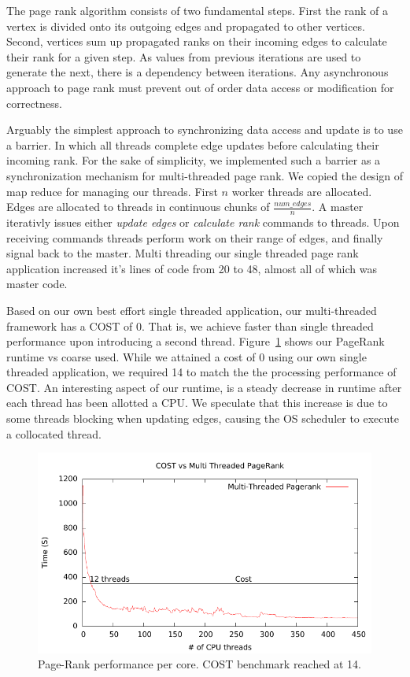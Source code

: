 The page rank algorithm consists of two fundamental steps. First the
rank of a vertex is divided onto its outgoing edges and propagated to
other vertices. Second, vertices sum up propagated ranks on their
incoming edges to calculate their rank for a given step. As values
from previous iterations are used to generate the next, there is a
dependency between iterations. Any asynchronous approach to page rank
must prevent out of order data access or modification for correctness.

Arguably the simplest approach to synchronizing data access and update
is to use a barrier. In which all threads complete edge updates before
calculating their incoming rank. For the sake of simplicity, we
implemented such a barrier as a synchronization mechanism for
multi-threaded page rank. We copied the design of map reduce for
managing our threads. First $n$ worker threads are allocated. Edges
are allocated to threads in continuous chunks of
$\frac{num\_edges}{n}$. A master iterativly issues either \emph{update
edges} or \emph{calculate rank} commands to threads. Upon receiving
commands threads perform work on their range of edges, and finally
signal back to the master. Multi threading our single threaded page
rank application increased it's lines of code from 20 to 48, almost
all of which was master code.

Based on our own best effort single threaded application, our
multi-threaded framework has a COST of 0. That is, we achieve faster
than single threaded performance upon introducing a second thread.
Figure~\ref{fig:page-rank-performance} shows our PageRank runtime vs
coarse used. While we attained a cost of 0 using our own single
threaded application, we required 14 to match the the processing
performance of COST. An interesting aspect of our runtime, is a steady
decrease in runtime after each thread has been allotted a CPU. We
speculate that this increase is due to some threads blocking when
updating edges, causing the OS scheduler to execute a collocated thread.

\begin{figure}[h]
\includegraphics[width=\linewidth]{"fig/page_rank_performance"}
\caption{Page-Rank performance per core. COST benchmark reached at 14.}
\label{fig:page-rank-performance}
\end{figure}

